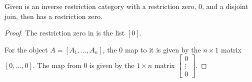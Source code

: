 \begin{lemma}\label{lem:imat_has_restriction_zero}
  Given \X is an inverse restriction category with a restriction zero, $0$, and a disjoint join,
  then \imatx has a restriction zero.
\end{lemma}
\begin{proof}
  The restriction zero in \imatx is the list $[0]$.

  For the object $A=[A_1,\ldots,A_n]$, the $0$ map to it is given by the $n\times 1$ matrix
  $[0,\ldots,0]$. The map from $0$ is given by the $1\times n$ matrix
  $\begin{bmatrix}0\\ \vdots\\ 0\end{bmatrix}$.

\end{proof}

